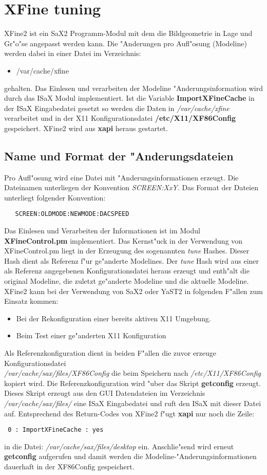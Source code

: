 \chapter{XFine tuning}
\label{cha:xfi}
\minitoc
XFine2 ist ein SaX2 Programm-Modul mit dem die Bildgeometrie
in Lage und Gr"o"se angepasst werden kann. Die "Anderungen pro
Aufl"osung (Modeline) werden dabei in einer Datei im Verzeichnis:
\begin{itemize}
\item /var/cache/xfine
\end{itemize}
gehalten. Das Einlesen und verarbeiten der Modeline "Anderungsinformation
wird durch das ISaX Modul implementiert. Ist die Variable 
\textbf{ImportXFineCache} in der ISaX Eingabedatei gesetzt so werden
die Daten in \textit{/var/cache/xfine} verarbeitet und in
der X11 Konfigurationsdatei \textbf{/etc/X11/XF86Config} gespeichert.
XFine2 wird aus \textbf{xapi} heraus gestartet.

\section{Name und Format der "Anderungsdateien}
Pro Aufl"osung wird eine Datei mit "Anderungsinformationen erzeugt.
Die Dateinamen unterliegen der Konvention \textit{SCREEN:XxY}.
Das Format der Dateien unterliegt folgender Konvention:
\begin{verbatim}
   SCREEN:OLDMODE:NEWMODE:DACSPEED
\end{verbatim}

Das Einlesen und Verarbeiten der Informationen ist im Modul
\textbf{XFineControl.pm} implementiert. Das Kernst"uck in der 
Verwendung von XFineControl.pm liegt in der Erzeugung des 
sogenannten \textit{tune} Hashes. Dieser Hash dient 
als Referenz f"ur ge"anderte Modelines. Der \textit{tune} Hash wird
aus einer als Referenz angegebenen Konfigurationsdatei heraus
erzeugt und enth"alt die original Modeline, die zuletzt ge"anderte 
Modeline und die aktuelle Modeline. XFine2 kann bei der Verwendung
von SaX2 oder YaST2 in folgenden F"allen zum Einsatz kommen:
\begin{itemize}
\item Bei der Rekonfiguration einer bereits aktiven X11 Umgebung.
\item Beim Test einer ge"anderten X11 Konfiguration
\end{itemize}
Als Referenzkonfiguration dient in beiden F"allen die zuvor
erzeuge Konfigurationsdatei\\
\textit{/var/cache/sax/files/XF86Config}
die beim Speichern nach \textit{/etc/X11/XF86Config} kopiert wird.
Die Referenzkonfiguration wird "uber das Skript \textbf{getconfig}
erzeugt. Dieses Skript erzeugt aus den GUI Datendateien im Verzeichnis
\textit{/var/cache/sax/files/} eine ISaX Eingabedatei und ruft den
ISaX mit dieser Datei auf. Entsprechend des Return-Codes von XFine2 
f"ugt \textbf{xapi} nur noch die Zeile:
\begin{verbatim}
 0 : ImportXFineCache : yes
\end{verbatim}
in die Datei: \textit{/var/cache/sax/files/desktop} ein.
Anschlie"send wird erneut \textbf{getconfig} aufgerufen und damit werden
die Modeline-"Anderungsinformationen dauerhaft in der XF86Config
gespeichert.
